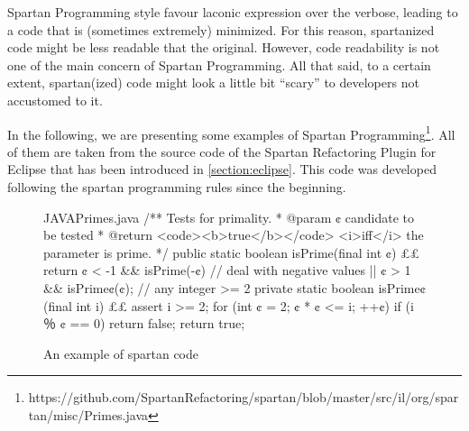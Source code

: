 Spartan Programming style favour laconic expression over the verbose, leading
to a code that is (sometimes extremely) minimized. For this reason, spartanized
code might be less readable that the original. However, code readability is not
one of the main concern of Spartan Programming. All that said, to a certain
extent, spartan(ized) code might look a little bit ``scary'' to developers not
accustomed to it.

In the following, we are presenting some examples of Spartan
Programming\footnote{https://github.com/SpartanRefactoring/spartan/blob/master/src/il/org/spartan/misc/Primes.java}.
All of them are taken from the source code of the Spartan Refactoring Plugin
for Eclipse that has been introduced in \cref{section:eclipse}.  This code was
developed following the spartan programming rules since the beginning.



% 
% 
\begin{figure}[h]
\label{figure:shock-2}
\caption{An example of spartan code}
\begin{Code}{JAVA}{Primes.java}
/** Tests for primality.
  * @param ¢ candidate to be tested
  * @return <code><b>true</b></code> <i>iff</i> the parameter is prime. */
public static boolean isPrime(final int ¢) {££
  return ¢ < -1 && isPrime(-¢) // deal with negative values
      || ¢ > 1 && isPrime¢(¢); // any integer >= 2
}
private static boolean isPrime¢(final int i) {££
  assert i >= 2;
  for (int ¢ = 2; ¢ * ¢ <= i; ++¢)
    if (i ％ ¢ == 0)
      return false;
  return true;
}
\end{Code}
\end{figure}

